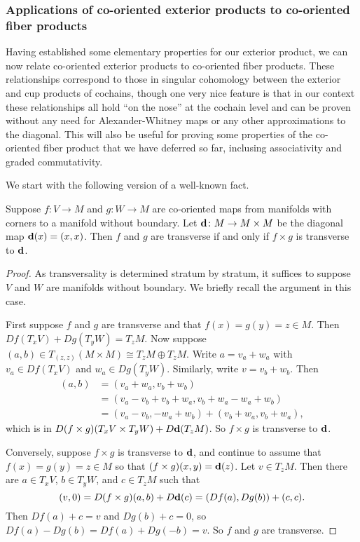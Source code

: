 \subsubsection{Applications of co-oriented exterior products to co-oriented fiber products}\label{S: product relations}

Having established some elementary properties for our exterior product, we can now relate co-oriented exterior products to co-oriented fiber products.
These relationships correspond to those in singular cohomology between the exterior and cup products of cochains, though one very nice feature is that in our context these relationships all hold ``on the nose'' at the cochain level and can be proven without any need for Alexander-Whitney maps or any other approximations to the diagonal.
This will also be useful for proving some properties of the co-oriented fiber product that we have deferred so far, inclusing associativity and graded commutativity.

We start with the following version of a well-known fact.


\begin{lemma}\label{L: alternative transversality}
	Suppose $f \colon V \to M$ and $g \colon W \to M$ are co-oriented maps from manifolds with corners to a manifold without boundary.
	Let $\mathbf{d} \colon M \to M \times M$ be the diagonal map $\mathbf{d}(x) = (x,x)$.
	Then $f$ and $g$ are transverse if and only if $f \times g$ is transverse to $\mathbf{d}$.
\end{lemma}
\begin{proof}
	As transversality is determined stratum by stratum, it suffices to suppose $V$ and $W$ are manifolds without boundary.
	We briefly recall the argument in this case.

	First suppose $f$ and $g$ are transverse and that $f(x) = g(y) = z \in M$.
	Then $Df(T_xV)+Dg(T_yW) = T_zM$.
	Now suppose $(a,b) \in T_{(z,z)}(M \times M) \cong T_zM \oplus T_zM$.
	Write $a = v_a+w_a$ with $v_a \in Df(T_xV)$ and $w_a \in Dg(T_yW)$.
	Similarly, write $v = v_b+w_b$.
	Then
	\begin{align*}
		(a,b)& = (v_a+w_a,v_b+w_b)\\
		& = (v_a-v_b+v_b+w_a, v_b+w_a-w_a+w_b)\\
		& = (v_a-v_b,-w_a+w_b)+(v_b+w_a, v_b+w_a),
	\end{align*}
	which is in $D(f \times g)(T_xV \times T_yW)+D\mathbf{d}(T_zM)$.
	So $f \times g$ is transverse to $\mathbf{d}$.

	Conversely, suppose $f \times g$ is transverse to $\mathbf{d}$, and continue to assume that $f(x) = g(y) = z \in M$ so that $(f \times g)(x,y) = \mathbf{d}(z)$.
	Let $v \in T_zM$.
	Then there are $a\in T_x V$, $b \in T_y W$, and $c \in T_zM$ such that $$(v,0) = D(f \times g)(a,b) + D\mathbf{d}(c) = (Df(a), Dg(b)) + (c,c).$$
	Then $Df(a) + c = v$ and $Dg(b) + c = 0$, so $Df(a) - Dg(b) = Df(a) + Dg(-b) = v$.
	So $f$ and $g$ are transverse.
\end{proof}

